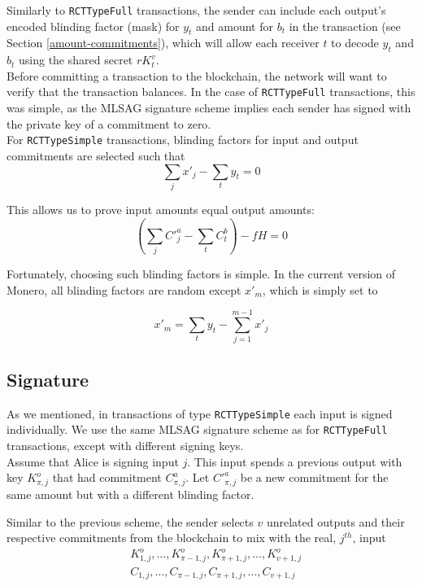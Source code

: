 Similarly to {\tt RCTTypeFull} transactions, the sender can include each output’s encoded blinding factor (mask) for $y_t$ and amount for $b_t$ in the transaction (see Section \ref{amount-commitments}), which will allow each receiver $t$ to decode $y_t$ and $b_t$ using the shared secret $r K_t^v$.
\\

Before committing a transaction to the blockchain, the network will want to verify that the transaction balances. In the case of {\tt RCTTypeFull} transactions, this was simple, as the MLSAG signature scheme implies each sender has signed with the private key of a commitment to zero.
\\

For {\tt RCTTypeSimple} transactions, blinding factors for input and output commitments are selected such that
\[\sum_j x'_j  - \sum_t y_t = 0  \]

This allows us to prove input amounts equal output amounts:\\
\[ (\sum_j C'^a_{j} - \sum_t C^b_{t}) - f H = 0\]


Fortunately, choosing such blinding factors is simple. In the current version of Monero, all blinding factors are random except $x'_m$, which is simply set to

\[x'_m = \sum_t y_t - \sum_{j=1}^{m-1} x'_j  \]




\subsection{Signature}

As we mentioned, in transactions of type {\tt RCTTypeSimple} each input is signed individually. We use the same MLSAG signature scheme as for {\tt RCTTypeFull} transactions, except with different signing keys.
\\

Assume that Alice is signing input $j$. This input spends a previous output with key $K^o_{\pi,j}$ that had commitment $C^a_{\pi,j}$. Let $C'^a_{\pi,j}$ be a new commitment for the same amount but with a different blinding factor.

Similar to the previous scheme, the sender selects $v$ unrelated outputs and their respective commitments from the blockchain to mix with the real, $j^{th}$, input\vspace{.2cm}
\begin{align*}
& K^o_{1, j}, ..., K^o_{\pi-1, j}, K^o_{\pi+1, j}, ..., K^o_{v+1, j} \\
& C_{1, j}, ..., C_{\pi-1, j}, C_{\pi+1, j}, ..., C_{v+1, j}
\end{align*}


